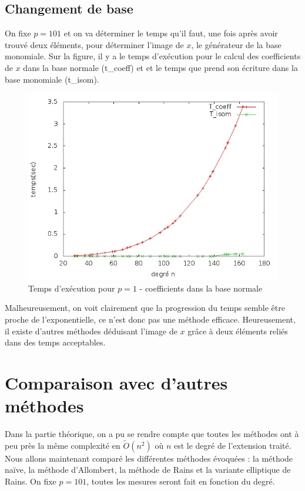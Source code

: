 \documentclass[a4paper]{article} %
\numberwithin{section}{part}
\numberwithin{equation}{section}
\newcommand\tO[1]{\widetilde{O}(#1)}
\begin{document}
\subsection{Changement de base}
On fixe $p = 101$ et on va déterminer le temps qu'il faut, une fois après avoir
trouvé deux éléments, pour déterminer l'image de $x$, le générateur de la base
monomiale. Sur la figure, il y a le temps d'exécution pour le calcul des 
coefficients de $x$ dans la base normale (t\_coeff) et et le temps que prend son
écriture dans la base monomiale (t\_isom).
\begin{figure}[H]
\centering
\includegraphics[scale=0.6]{data_test19_testnorm2}
\caption{Temps d'exécution pour $p = 1$ - coefficients dans la base normale}
\label{fig:tempsbasenormale}
\end{figure}
Malheureusement, on voit clairement que la progression du temps semble être
proche de l'exponentielle, ce n'est donc pas une méthode efficace. Heureusement,
il existe d'autres méthodes déduisant l'image de $x$ grâce à deux
éléments reliés dans des temps acceptables.


\section{Comparaison avec d'autres méthodes}
%
%
%
Dans la partie théorique, on a pu se rendre compte que toutes les méthodes ont à
peu près la même complexité en $\tO{n^2}$ où $n$ est le degré de l'extension
traité. Nous allons maintenant comparé les différentes méthodes évoquées :
la méthode naïve, la méthode d'Allombert, la méthode de Rains et la variante
elliptique de Rains. On fixe $p = 101$, toutes les mesures seront fait en
fonction du degré.
\end{document}
